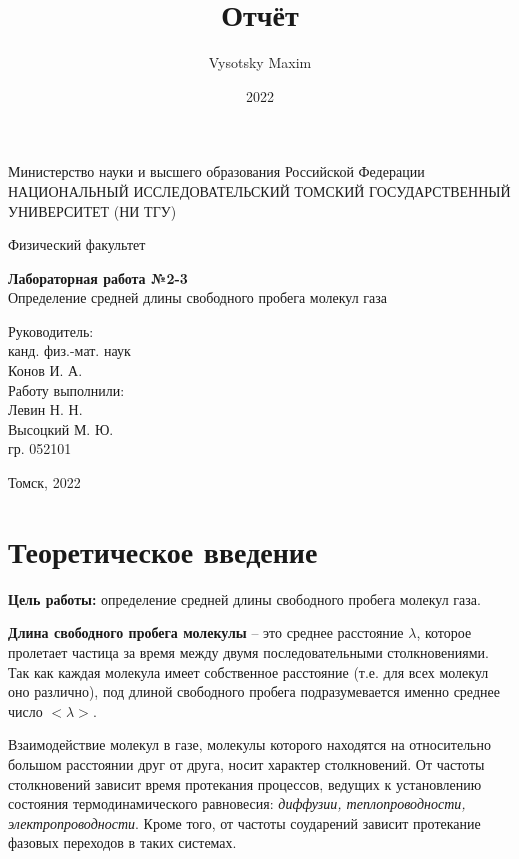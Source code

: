 \documentclass[a4paper,12pt]{article}
\author{Vysotsky Maxim}
\title{Отчёт}
\date{2022}
\begin{document}
	\begin{titlepage}
		\begin{center}
			{Министерство науки и высшего образования Российской Федерации
				НАЦИОНАЛЬНЫЙ ИССЛЕДОВАТЕЛЬСКИЙ ТОМСКИЙ
				ГОСУДАРСТВЕННЫЙ УНИВЕРСИТЕТ (НИ ТГУ)}
		\end{center}
		\begin{center}
			{Физический факультет}
		\end{center}
		
		
		\vspace{8cm}
		{
			\begin{center}
				{\bf Лабораторная работа №2-3}\\
				Определение средней длины свободного пробега молекул газа
			\end{center}
		}
		\vspace{2cm}
		\begin{flushright}
			{Руководитель:\\ канд. физ.-мат. наук\\
				Конов И. А. \\
				Работу выполнили:\\
				Левин Н. Н. \\
				Высоцкий М. Ю.\\
				\vspace{0.2cm}
				гр. 052101}
		\end{flushright}
		\vspace{3cm}
		\begin{center}
			Томск, 2022
		\end{center}
	\end{titlepage}

\section{Теоретическое введение}
\textbf{Цель работы:} определение средней длины свободного пробега молекул газа.

\textbf{Длина свободного пробега молекулы } -- это среднее расстояние $\lambda$, которое пролетает частица за время между двумя последовательными столкновениями. Так как каждая молекула имеет собственное расстояние (т.е. для всех молекул оно различно), под длиной свободного пробега подразумевается именно среднее число $<\lambda>$.

Взаимодействие молекул в газе, молекулы которого находятся на относительно большом расстоянии друг от друга, носит характер столкновений. От частоты столкновений зависит время протекания процессов, ведущих к установлению состояния термодинамического равновесия: \textit{диффузии, теплопроводности, электропроводности}. Кроме того, от частоты соударений зависит протекание фазовых переходов в таких системах.
\end{document}
